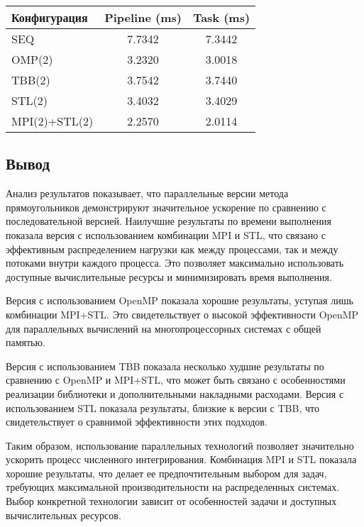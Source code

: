 \documentclass[12pt,a4paper]{extarticle}
\begin{document}
\begin{center}
\begin{tabular}{|l|c|c|}
\hline
\textbf{Конфигурация} & \textbf{Pipeline (ms)} & \textbf{Task (ms)} \\
\hline
SEQ       & 7.7342 & 7.3442 \\
OMP(2)          & 3.2320 & 3.0018 \\
TBB(2)          & 3.7542 & 3.7440 \\
STL(2)          & 3.4032 & 3.4029 \\
MPI(2)+STL(2)   & 2.2570 & 2.0114 \\
\hline
\end{tabular}
\end{center}

\subsection*{Вывод}

Анализ результатов показывает, что параллельные версии метода прямоугольников демонстрируют значительное ускорение по сравнению с последовательной версией. Наилучшие результаты по времени выполнения показала версия с использованием комбинации MPI и STL, что связано с эффективным распределением нагрузки как между процессами, так и между потоками внутри каждого процесса. Это позволяет максимально использовать доступные вычислительные ресурсы и минимизировать время выполнения.

Версия с использованием OpenMP показала хорошие результаты, уступая лишь комбинации MPI+STL. Это свидетельствует о высокой эффективности OpenMP для параллельных вычислений на многопроцессорных системах с общей памятью.

Версия с использованием TBB показала несколько худшие результаты по сравнению с OpenMP и MPI+STL, что может быть связано с особенностями реализации библиотеки и дополнительными накладными расходами. Версия с использованием STL показала результаты, близкие к версии с TBB, что свидетельствует о сравнимой эффективности этих подходов.

Таким образом, использование параллельных технологий позволяет значительно ускорить процесс численного интегрирования. Комбинация MPI и STL показала хорошие результаты, что делает ее предпочтительным выбором для задач, требующих максимальной производительности на распределенных системах. Выбор конкретной технологии зависит от особенностей задачи и доступных вычислительных ресурсов.
\end{document}
